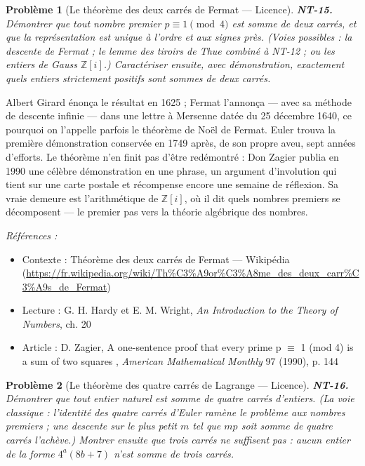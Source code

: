 \documentclass[11pt]{article}
\newtheorem{problem}{Problème}
\newenvironment{refs}{\par\small\noindent\emph{Références :}\begin{itemize}\setlength\itemsep{0pt}}{\end{itemize}\normalsize}
\begin{document}
\bigskip

\begin{problem}[{Le théorème des deux carrés de Fermat --- Licence}]
\textbf{NT-15.} Démontrer que tout nombre premier $p \equiv 1 \pmod 4$ est
somme de deux carrés, et que la représentation est unique à l'ordre et aux signes près.
(Voies possibles : la descente de Fermat ; le lemme des tiroirs de Thue combiné à NT-12 ; ou les
entiers de Gauss $\mathbb{Z}[i]$.) Caractériser ensuite, avec démonstration, exactement quels
entiers strictement positifs sont sommes de deux carrés.
\end{problem}

\noindent Albert Girard énonça le résultat en 1625 ; Fermat l'annonça --- avec sa méthode de
descente infinie --- dans une lettre à Mersenne datée du 25 décembre 1640, ce pourquoi on l'appelle
parfois le théorème de Noël de Fermat. Euler trouva la première démonstration conservée en 1749
après, de son propre aveu, sept années d'efforts. Le théorème n'en finit pas d'être redémontré : Don
Zagier publia en 1990 une célèbre démonstration en une phrase, un argument d'involution qui tient sur
une carte postale et récompense encore une semaine de réflexion. Sa vraie demeure est l'arithmétique
de $\mathbb{Z}[i]$, où il dit quels nombres premiers se décomposent --- le premier pas vers la
théorie algébrique des nombres.

\begin{refs}
\item Contexte : Théorème des deux carrés de Fermat --- Wikipédia (\url{https://fr.wikipedia.org/wiki/Th%C3%A9or%C3%A8me_des_deux_carr%C3%A9s_de_Fermat})
\item Lecture : G. H. Hardy et E. M. Wright, \textit{An Introduction to the Theory of Numbers}, ch. 20
\item Article : D. Zagier, \og{} A one-sentence proof that every prime p $\equiv$ 1 (mod 4) is a sum of two squares \fg{}, \textit{American Mathematical Monthly} 97 (1990), p. 144
\end{refs}

\bigskip

\begin{problem}[{Le théorème des quatre carrés de Lagrange --- Licence}]
\textbf{NT-16.} Démontrer que tout entier naturel est somme de quatre carrés
d'entiers. (La voie classique : l'identité des quatre carrés d'Euler ramène le problème aux nombres
premiers ; une descente sur le plus petit $m$ tel que $mp$ soit somme de quatre carrés
l'achève.) Montrer ensuite que trois carrés ne suffisent pas : aucun entier de la forme
$4^a(8b + 7)$ n'est somme de trois carrés.
\end{problem}
\end{document}
